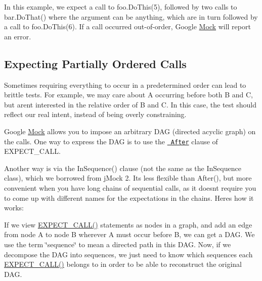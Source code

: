 \begin{DoxyCode}{0}
\DoxyCodeLine{}
\DoxyCodeLine{\{}
\DoxyCodeLine{}
\DoxyCodeLine{\}}
\end{DoxyCode}


In this example, we expect a call to {\ttfamily foo.\+Do\+This(5)}, followed by two calls to {\ttfamily bar.\+Do\+That()} where the argument can be anything, which are in turn followed by a call to {\ttfamily foo.\+Do\+This(6)}. If a call occurred out-\/of-\/order, Google \mbox{\hyperlink{classMock}{Mock}} will report an error.

\subsection*{Expecting Partially Ordered Calls}

Sometimes requiring everything to occur in a predetermined order can lead to brittle tests. For example, we may care about {\ttfamily A} occurring before both {\ttfamily B} and {\ttfamily C}, but aren\textquotesingle{}t interested in the relative order of {\ttfamily B} and {\ttfamily C}. In this case, the test should reflect our real intent, instead of being overly constraining.

Google \mbox{\hyperlink{classMock}{Mock}} allows you to impose an arbitrary D\+AG (directed acyclic graph) on the calls. One way to express the D\+AG is to use the \href{CheatSheet.md\#the-after-clause}{\texttt{ After}} clause of {\ttfamily E\+X\+P\+E\+C\+T\+\_\+\+C\+A\+LL}.

Another way is via the {\ttfamily In\+Sequence()} clause (not the same as the {\ttfamily In\+Sequence} class), which we borrowed from j\+Mock 2. It\textquotesingle{}s less flexible than {\ttfamily After()}, but more convenient when you have long chains of sequential calls, as it doesn\textquotesingle{}t require you to come up with different names for the expectations in the chains. Here\textquotesingle{}s how it works\+:

If we view {\ttfamily \mbox{\hyperlink{gmock-spec-builders_8h_a535a6156de72c1a2e25a127e38ee5232}{E\+X\+P\+E\+C\+T\+\_\+\+C\+A\+L\+L()}}} statements as nodes in a graph, and add an edge from node A to node B wherever A must occur before B, we can get a D\+AG. We use the term \char`\"{}sequence\char`\"{} to mean a directed path in this D\+AG. Now, if we decompose the D\+AG into sequences, we just need to know which sequences each {\ttfamily \mbox{\hyperlink{gmock-spec-builders_8h_a535a6156de72c1a2e25a127e38ee5232}{E\+X\+P\+E\+C\+T\+\_\+\+C\+A\+L\+L()}}} belongs to in order to be able to reconstruct the original D\+AG.

